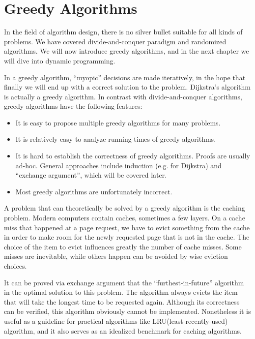 \ifx\PREAMBLE\undefined


\fi
\chapter{Greedy Algorithms}
In the field of algorithm design, there is no silver bullet suitable for all kinds of problems. We have covered divide-and-conquer paradigm and randomized algorithms. We will now introduce greedy algorithms, and in the next chapter we will dive into dynamic programming.

In a greedy algorithm, ``myopic'' decisions are made iteratively, in the hope that finally we will end up with a correct solution to the problem. Dijkstra's algorithm is actually a greedy algorithm. In contrast with divide-and-conquer algorithms, greedy algorithms have the following features:
\begin{itemize}
\item It is easy to propose multiple greedy algorithms for many problems.
\item It is relatively easy to analyze running times of greedy algorithms.
\item It is hard to establish the correctness of greedy algorithms. Proofs are usually ad-hoc. General approaches include induction (e.g. for Dijkstra) and ``exchange argument'', which will be covered later.
\item Most greedy algorithms are unfortunately incorrect.
\end{itemize}

A problem that can theoretically be solved by a greedy algorithm is the caching problem. Modern computers contain caches, sometimes a few layers. On a cache miss that happened at a page request, we have to evict something from the cache in order to make room for the newly requested page that is not in the cache. The choice of the item to evict influences greatly the number of cache misses. Some misses are inevitable, while others happen can be avoided by wise eviction choices. 

It can be proved via exchange argument that the ``furthest-in-future'' algorithm in the optimal solution to this problem. The algorithm always evicts the item that will take the longest time to be requested again. Although its correctness can be verified, this algorithm obviously cannot be implemented. Nonetheless it is useful as a guideline for practical algorithms like LRU(least-recently-used) algorithm, and it also serves as an idealized benchmark for caching algorithms.
